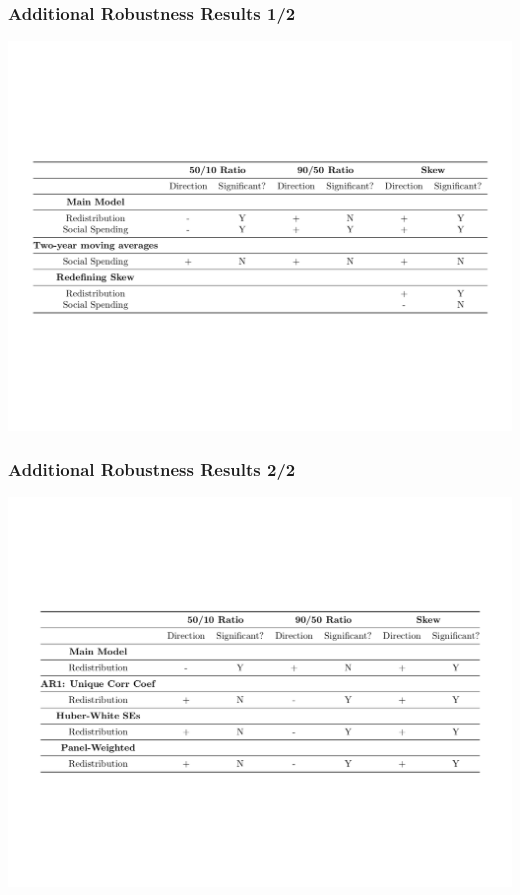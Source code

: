 \documentclass{beamer}
\begin{document}
\begin{frame}
\begin{itemize}
\begin{frame}
\frametitle{Additional Robustness Results 1/2}
\begin{center}
\includegraphics[scale=0.4]{robustnesscheck2}
\end{center}
\end{frame}

\begin{frame}
\frametitle{Additional Robustness Results 2/2}
\begin{center}
\includegraphics[scale=0.4]{robustnesscheck3}
\end{center}
\end{frame}


\end{itemize}
\end{frame}
\end{document}
